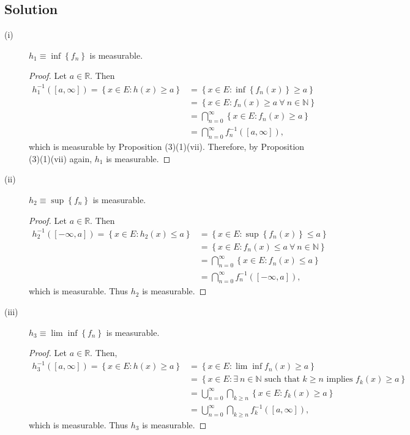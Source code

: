 \documentclass[12pt]{article}
\begin{document}
\subsection*{Solution}
\begin{description}
\item[(i)] $h_{1} \equiv \inf\left\{ f_{n} \right\}$ is measurable. 

\begin{proof}
Let $a \in \mathbb{R}$. Then 
\begin{align*}
h_{1}^{-1}\left( [a,\infty] \right) = \left\{ x \in E : h(x) \geq a \right\} & = \left\{ x \in E : \inf\left\{ f_{n}(x) \right\} \geq a \right\} \\
& = \left\{ x \in E : f_{n}(x) \geq a \ \forall\ n \in \mathbb{N} \right\} \\
& = \bigcap_{n=0}^{\infty}\left\{ x \in E : f_{n}(x) \geq a \right\} \\
& = \bigcap_{n=0}^{\infty}f_{n}^{-1}\left( [a,\infty] \right),
\end{align*}
which is measurable by Proposition (3)(1)(vii). Therefore, by Proposition (3)(1)(vii) again, $h_{1}$ is measurable.
\end{proof}

\item[(ii)] $h_{2} \equiv \sup\left\{ f_{n} \right\}$ is measurable.

\begin{proof}
Let $a \in \mathbb{R}$. Then 
\begin{align*}
h_{2}^{-1}\left( [-\infty, a] \right) = \left\{ x \in E : h_{2}(x) \leq a \right\} & = \left\{ x \in E : \sup\left\{ f_{n}(x) \right\} \leq a \right\}
\\
& = \left\{ x \in E : f_{n}(x) \leq a\ \forall\ n \in \mathbb{N} \right\} \\
& = \bigcap_{n=0}^{\infty}\left\{ x \in E : f_{n}(x) \leq a \right\} \\
& = \bigcap_{n=0}^{\infty}f_{n}^{-1}\left( [-\infty, a] \right),
\end{align*}
which is measurable. Thus $h_{2}$ is measurable.
\end{proof}

\item[(iii)] $h_{3} \equiv \lim\inf\left\{ f_{n} \right\}$ is measurable.

\begin{proof}
Let $a \in \mathbb{R}$. Then, 
\begin{align*}
h_{3}^{-1}\left( [a,\infty] \right) = \left\{ x \in E : h(x) \geq a \right\} & = \left\{ x \in E : \lim\inf f_{n}(x) \geq a \right\} \\
& = \left\{ x \in E: \exists\ n \in \mathbb{N} \text{ such that } k \geq n \text{ implies } f_{k}(x) \geq a \right\} \\
& = \bigcup_{n=0}^{\infty}\bigcap_{k\geq n}\left\{ x \in E : f_{k}(x) \geq a \right\} \\
& = \bigcup_{n=0}^{\infty}\bigcap_{k\geq n}f_{k}^{-1}\left( [a,\infty] \right),
\end{align*}
which is measurable. Thus $h_{3}$ is measurable.
\end{proof}


\end{description}
\end{document}
